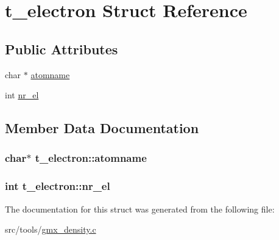\hypertarget{structt__electron}{\section{t\-\_\-electron \-Struct \-Reference}
\label{structt__electron}
}
\subsection*{\-Public \-Attributes}
\begin{DoxyCompactItemize}
\item 
char $\ast$ \hyperlink{structt__electron_af1ad0e206e613ca3216fe5bfa08eda39}{atomname}
\item 
int \hyperlink{structt__electron_a850d2d54f01f5c3f2e037516ee3e0ac9}{nr\-\_\-el}
\end{DoxyCompactItemize}


\subsection{\-Member \-Data \-Documentation}
\hypertarget{structt__electron_af1ad0e206e613ca3216fe5bfa08eda39}{
\subsubsection[{atomname}]{\setlength{\rightskip}{0pt plus 5cm}char$\ast$ {\bf t\-\_\-electron\-::atomname}}}\label{structt__electron_af1ad0e206e613ca3216fe5bfa08eda39}
\hypertarget{structt__electron_a850d2d54f01f5c3f2e037516ee3e0ac9}{
\subsubsection[{nr\-\_\-el}]{\setlength{\rightskip}{0pt plus 5cm}int {\bf t\-\_\-electron\-::nr\-\_\-el}}}\label{structt__electron_a850d2d54f01f5c3f2e037516ee3e0ac9}


\-The documentation for this struct was generated from the following file\-:\begin{DoxyCompactItemize}
\item 
src/tools/\hyperlink{gmx__density_8c}{gmx\-\_\-density.\-c}\end{DoxyCompactItemize}

